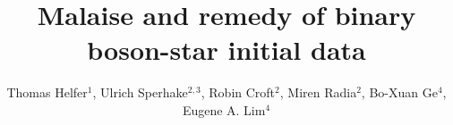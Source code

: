 \documentclass[]{iopart}
\begin{document}

\pagestyle{fancy}
\chead{}
\rhead{\thepage}
\lfoot{}
\cfoot{}
\rfoot{}

\begin{center}
\title{\large Malaise and remedy of binary boson-star initial data}
\end{center}

\author{
Thomas Helfer$^{1}$,
Ulrich Sperhake$^{2,3}$,
Robin Croft$^{2}$,
Miren Radia$^{2}$,
Bo-Xuan Ge$^4$,
Eugene A. Lim$^4$
}

\address{$^{1}$~Department of Physics and Astronomy, Johns Hopkins University, 3400 N. Charles Street, Baltimore, Maryland 21218, USA}

\address{$^{2}$~Department of Applied Mathematics and Theoretical Physics,
Centre for Mathematical Sciences, University of Cambridge,
Wilberforce Road, Cambridge CB3 0WA, United Kingdom}

\address{$^{3}$~Theoretical Astrophysics 350-17,
California Institute of Technology,
1200 E California Boulevard, Pasadena, CA 91125, USA}


\address{$^{4}$~Theoretical Particle Physics and Cosmology Group, Physics Department,Kings College London, Strand, London WC2R 2LS, United Kingdom}



\end{document}
